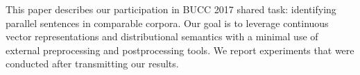 This paper describes our participation in BUCC 2017 shared task: identifying parallel sentences in comparable corpora. Our goal is to leverage continuous vector representations and distributional semantics with a minimal use of external preprocessing and postprocessing tools. We report experiments that were conducted after transmitting our results.
